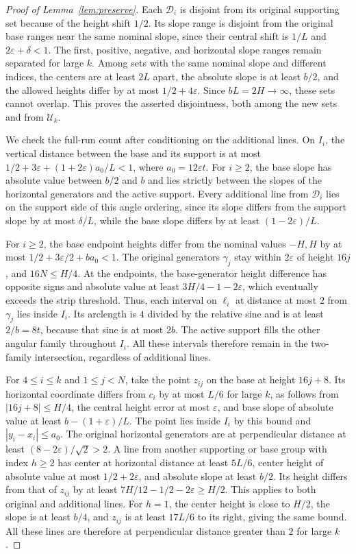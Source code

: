 \documentclass[11pt,letterpaper]{article}
\begin{document}
\begin{proof}[Proof of Lemma~\ref{lem:preserve}]
Each $\mathscr D_i$ is disjoint from its original supporting set because of the height shift $1/2$. Its slope range is disjoint from the original base ranges near the same nominal slope, since their central shift is $1/L$ and $2\varepsilon+\delta<1$. The first, positive, negative, and horizontal slope ranges remain separated for large $k$. Among sets with the same nominal slope and different indices, the centers are at least $2L$ apart, the absolute slope is at least $b/2$, and the allowed heights differ by at most $1/2+4\varepsilon$. Since $bL=2H\to\infty$, these sets cannot overlap. This proves the asserted disjointness, both among the new sets and from $\mathscr U_k$.

We check the full-run count after conditioning on the additional lines. On $I_i$, the vertical distance between the base and its support is at most $1/2+3\varepsilon+(1+2\varepsilon)a_0/L<1$, where $a_0=12\varepsilon t$. For $i\ge2$, the base slope has absolute value between $b/2$ and $b$ and lies strictly between the slopes of the horizontal generators and the active support. Every additional line from $\mathscr D_i$ lies on the support side of this angle ordering, since its slope differs from the support slope by at most $\delta/L$, while the base slope differs by at least $(1-2\varepsilon)/L$.

For $i\ge2$, the base endpoint heights differ from the nominal values $-H,H$ by at most $1/2+3\varepsilon/2+ba_0<1$. The original generators $\gamma_j$ stay within $2\varepsilon$ of height $16j$, and $16N\le H/4$. At the endpoints, the base-generator height difference has opposite signs and absolute value at least $3H/4-1-2\varepsilon$, which eventually exceeds the strip threshold. Thus, each interval on $\ell_i$ at distance at most $2$ from $\gamma_j$ lies inside $I_i$. Its arclength is $4$ divided by the relative sine and is at least $2/b=8t$, because that sine is at most $2b$. The active support fills the other angular family throughout $I_i$. All these intervals therefore remain in the two-family intersection, regardless of additional lines.

For $4\le i\le k$ and $1\le j<N$, take the point $z_{ij}$ on the base at height $16j+8$. Its horizontal coordinate differs from $c_i$ by at most $L/6$ for large $k$, as follows from $|16j+8|\le H/4$, the central height error at most $\varepsilon$, and base slope of absolute value at least $b-(1+\varepsilon)/L$. The point lies inside $I_i$ by this bound and $|y_i-x_i|\le a_0$. The original horizontal generators are at perpendicular distance at least $(8-2\varepsilon)/\sqrt2>2$. A line from another supporting or base group with index $h\ge2$ has center at horizontal distance at least $5L/6$, center height of absolute value at most $1/2+2\varepsilon$, and absolute slope at least $b/2$. Its height differs from that of $z_{ij}$ by at least $7H/12-1/2-2\varepsilon\ge H/2$. This applies to both original and additional lines. For $h=1$, the center height is close to $H/2$, the slope is at least $b/4$, and $z_{ij}$ is at least $17L/6$ to its right, giving the same bound. All these lines are therefore at perpendicular distance greater than $2$ for large $k$.


\end{proof}
\end{document}

